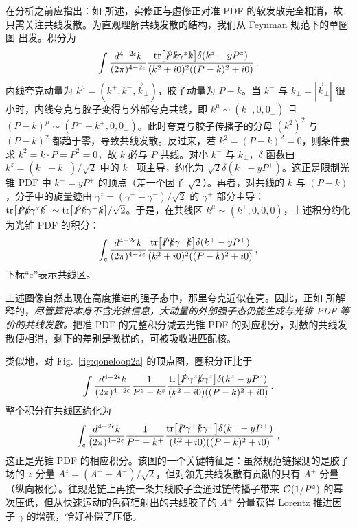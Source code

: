 在分析之前应指出：如  所述，实修正与虚修正对准 PDF 的软发散完全相消，故只需关注共线发散。为直观理解共线发散的结构，我们从 Feynman 规范下的单圈图  出发。积分为
\begin{align}
	\int \frac{d^{4-2\epsilon}k}{(2\pi)^{4-2\epsilon}}\frac{{\rm tr}\big[\slashed{P}\slashed{k}\gamma^z\slashed{k}\big]\delta(k^z-yP^z)}{(k^2+i0)^2((P-k)^2+i0)}\,.
\end{align}
内线夸克动量为 $k^\mu = (k^+,k^-,\vec{k}_\perp)$，胶子动量为 $P-k$。当 $k^-$ 与 $k_\perp=|\vec{k}_\perp|$ 很小时，内线夸克与胶子变得与外部夸克共线，即 $k^{\mu}\sim (k^+,0,0_\perp)$ 且 $(P-k)^{\mu}\sim (P^+-k^+,0,0_\perp)$。此时夸克与胶子传播子的分母 $(k^2)^2$ 与 $(P-k)^2$ 都趋于零，导致共线发散。反过来，若 $k^2=(P-k)^2=0$，则条件要求 $k^2=k\cdot P=P^2=0$，故 $k$ 必与 $P$ 共线。对小 $k^-$ 与 $k_\perp$，$\delta$ 函数由 $k^z=(k^+-k^-)/\sqrt{2}$ 中的 $k^+$ 项主导，约化为 $\sqrt{2}\delta(k^+-yP^+)$。这正是限制光锥 PDF 中 $k^+=yP^+$ 的顶点（差一个因子 $\sqrt{2}$）。再者，对共线的 $k$ 与 $(P-k)$，分子中的旋量迹由 $\gamma^z=(\gamma^+-\gamma^-)/\sqrt{2}$ 的 $\gamma^+$ 部分主导：${\rm tr}\big[\slashed{P}\slashed{k}\gamma^z\slashed{k}\big] \sim {\rm tr}\big[\slashed{P}\slashed{k}\gamma^+\slashed{k}\big]/\sqrt{2}$。于是，在共线区 $k^{\mu}\sim (k^+,0,0,0)$，上述积分约化为光锥 PDF 的积分：
\begin{align}
	\int_{\rm c} \frac{d^{4-2\epsilon}k}{(2\pi)^{4-2\epsilon}}\frac{{\rm tr}\big[\slashed{P}\slashed{k}\gamma^+\slashed{k}\big]\delta(k^+-yP^+) }{(k^2+i0)^2((P-k)^2+i0)}\,,
\end{align}
下标``c''表示共线区。

上述图像自然出现在高度推进的强子态中，那里夸克近似在壳。因此，正如  所解释的，{\it 尽管算符本身不含光锥信息，大动量的外部强子态仍能生成与光锥 PDF 等价的共线发散。}把准 PDF 的完整积分减去光锥 PDF 的对应积分，对数的共线发散便相消，剩下的差别是微扰的，可被吸收进匹配核。

类似地，对 Fig.~\ref{fig:qoneloop2a} 的顶点图，圈积分正比于
\begin{align}
	\int \frac{d^{4-2\epsilon}k}{(2\pi)^{4-2\epsilon}}\frac{1}{P^z-k^z}\frac{{\rm tr}\big[ \slashed{P} \gamma^z \slashed{k} \gamma^z\big] \delta(k^z-yP^z)}{(k^2+i0)((P-k)^2+i0)} \,.
\end{align}
整个积分在共线区约化为
\begin{align}
	\int_{\rm c} \frac{d^{4-2\epsilon}k}{(2\pi)^{4-2\epsilon}}\frac{1}{P^+-k^+}\frac{{\rm tr} \big[\slashed{P} \gamma^+ \slashed{k} \gamma^+\big]\delta(k^+-yP^+)}{(k^2+i0)((P-k)^2+i0)}  \ ,
\end{align}
这正是光锥 PDF 的相应积分。该图的一个关键特征是：虽然规范链探测的是胶子场的 $z$ 分量 $A^z =\left(A^+-A^-\right)/\sqrt{2}$，但对领先共线发散有贡献的只有 $A^+$ 分量（纵向极化）。往规范链上再接一条共线胶子会通过链传播子带来 ${\cal O}(1/P^z)$ 的幂次压低，但从快速运动的色荷辐射出的共线胶子的 $A^+$ 分量获得 Lorentz 推进因子 $\gamma$ 的增强，恰好补偿了压低。

